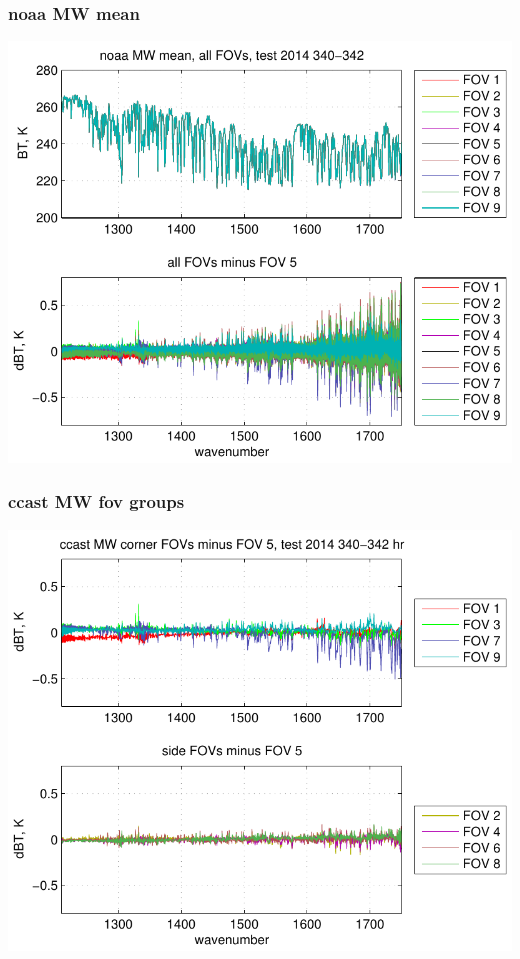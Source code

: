 \documentclass[11pt]{beamer}
\begin{document}
\begin{frame}
\frametitle{noaa MW mean}

\begin{center}
  \includegraphics[scale=0.7]{figures/noaa_MW_avg_2014_340-342.pdf}
\end{center}

\end{frame}
\begin{frame}
\frametitle{ccast MW fov groups}

\begin{center}
  \includegraphics[scale=0.7]{figures/ccast_MW_dif_2014_340-342_hr.pdf}
\end{center}

\end{frame}
\end{document}
